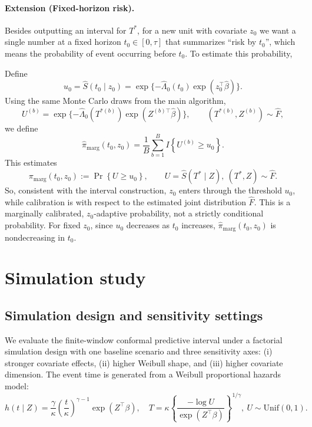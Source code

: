 \documentclass[11pt]{article}
\begin{document}
{\color{blue}
\paragraph{Extension (Fixed-horizon risk).}
Besides outputting an interval for $T^*$, for a new unit with
covariate $z_0$ we want a single number at a fixed horizon $t_0\in[0,\tau]$
that summarizes ``risk by $t_0$'', which means the probability of event occurring before $t_0$. To estimate this probability,

Define
\[
u_0=\widehat S(t_0\mid z_0)
=\exp\{-\widehat\Lambda_0(t_0)\exp(z_0^\top\widehat\beta)\}.
\]
Using the same Monte Carlo draws from the main algorithm,
\[
U^{(b)}=\exp\{-\widehat\Lambda_0(T^{*(b)})\exp(Z^{(b)\top}\widehat\beta)\},
\qquad (T^{*(b)},Z^{(b)})\sim \widehat F,
\]
we define
\[
\widehat\pi_{\mathrm{marg}}(t_0,z_0)
=\frac1B\sum_{b=1}^B I\!\left\{U^{(b)}\ge u_0\right\}.
\]
This estimates
\[
\pi_{\mathrm{marg}}(t_0,z_0)
:=\Pr\!\left\{U\ge u_0\right\},
\qquad
U=\widehat S(T^*\mid Z),\ (T^*,Z)\sim \widehat F.
\]
So, consistent with the interval construction, $z_0$ enters through the
threshold $u_0$, while calibration is with respect to the estimated joint
distribution $\widehat F$. This is a marginally calibrated, $z_0$-adaptive probability, not a strictly conditional probability. For fixed $z_0$, since $u_0$
decreases as $t_0$ increases,
$\widehat\pi_{\mathrm{marg}}(t_0,z_0)$ is nondecreasing in $t_0$.
}






\section{Simulation study}



\subsection{Simulation design and sensitivity settings}
We evaluate the finite-window conformal predictive interval under a factorial simulation
design with one baseline scenario and three sensitivity axes:
(i) stronger covariate effects, (ii) higher Weibull shape, and
(iii) higher covariate dimension.
The event time is generated from a Weibull proportional hazards model:
\[
h(t\mid Z)=\frac{\gamma}{\kappa}\left(\frac{t}{\kappa}\right)^{\gamma-1}\exp(Z^\top\beta),\quad
T=\kappa\left\{\frac{-\log U}{\exp(Z^\top\beta)}\right\}^{1/\gamma},\ U\sim\mathrm{Unif}(0,1).
\]
\end{document}
